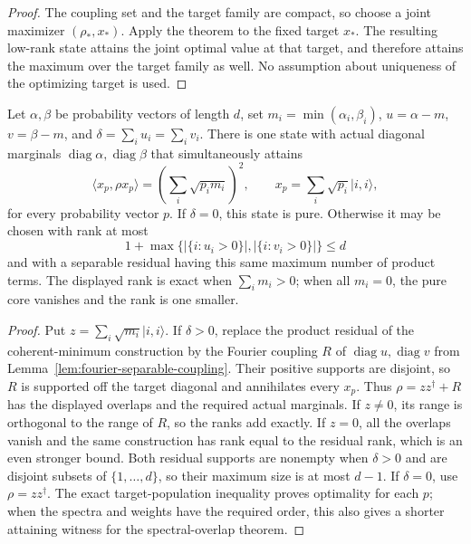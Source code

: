 \begin{proof}
The coupling set and the target family are compact, so choose a joint
maximizer $(\rho_*,x_*)$. Apply the theorem to the fixed target $x_*$.
The resulting low-rank state attains the joint optimal value at that
target, and therefore attains the maximum over the target family as
well. No assumption about uniqueness of the optimizing target is used.
\end{proof}

\begin{corollary}
Let $\alpha,\beta$ be probability vectors of length $d$, set
$m_i=\min(\alpha_i,\beta_i)$, $u=\alpha-m$, $v=\beta-m$, and
$\delta=\sum_i u_i=\sum_i v_i$. There is one state with actual diagonal
marginals $\operatorname{diag}\alpha,\operatorname{diag}\beta$ that
simultaneously attains
\[
 \langle x_p,\rho x_p\rangle
       =\left(\sum_i\sqrt{p_i m_i}\right)^2,
 \qquad x_p=\sum_i\sqrt{p_i}|i,i\rangle,
\]
for every probability vector $p$. If $\delta=0$, this state is pure.
Otherwise it may be chosen with rank at most
\[
           1+\max\{|\{i:u_i>0\}|,|\{i:v_i>0\}|\}\le d
\]
and with a separable residual having this same maximum number of product
terms. The displayed rank is exact when $\sum_i m_i>0$; when all
$m_i=0$, the pure core vanishes and the rank is one smaller.
\end{corollary}

\begin{proof}
Put $z=\sum_i\sqrt{m_i}|i,i\rangle$. If $\delta>0$, replace the
product residual of the coherent-minimum construction by the Fourier
coupling $R$ of $\operatorname{diag}u,\operatorname{diag}v$ from
Lemma~\ref{lem:fourier-separable-coupling}. Their positive supports are
disjoint, so $R$ is supported off the target diagonal and annihilates
every $x_p$. Thus $\rho=zz^\dagger+R$ has the displayed overlaps and
the required actual marginals. If $z\ne0$, its range is orthogonal to
the range of $R$, so the ranks add exactly. If $z=0$, all the overlaps
vanish and the same construction has rank equal to the residual rank,
which is an even stronger bound. Both residual supports are nonempty
when $\delta>0$ and are disjoint subsets of $\{1,\ldots,d\}$, so their
maximum size is at most $d-1$. If $\delta=0$, use $\rho=zz^\dagger$.
The exact target-population inequality proves optimality for each $p$;
when the spectra and weights have the required order, this also gives
a shorter attaining witness for the spectral-overlap theorem.
\end{proof}

